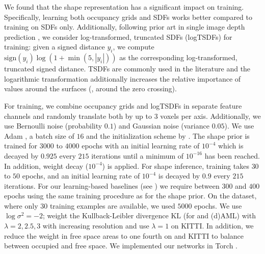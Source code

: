 We found that the shape representation has a significant impact on training. Specifically, learning both occupancy grids and SDFs works better compared to training on SDFs only. Additionally, following prior art in single image depth prediction \citep{Eigen2015ICCV,Eigen2014NIPS,Laina2016THREEDV}, we consider log-transformed, truncated SDFs (logTSDFs) for training: given a signed distance $y_i$, we compute $\text{sign}(y_i)\log(1 + \min(5, |y_i|))$ as the corresponding log-transformed, truncated signed distance. TSDFs are commonly used in the literature \citep{Newcombe2011ISMAR,Riegler2017THREEDV,Dai2017CVPRa,Engelmann2016GCPR,Curless1996SIGGRAPH} and the logarithmic transformation additionally increases the relative importance of values around the surfaces (\ie, around the zero crossing).

For training, we combine occupancy grids and logTSDFs in separate feature channels and randomly translate both by up to $3$ voxels per axis. Additionally, we use Bernoulli noise (probability $0.1$) and Gaussian noise (variance $0.05$). We use Adam \citep{Kingma2015ICLR}, a batch size of $16$ and the initialization scheme by \cite{Glorot2010AISTATS}. The shape prior is trained for $3000$ to $4000$ epochs with an initial learning rate of $10^{-4}$ which is decayed by $0.925$ every $215$ iterations until a minimum of $10^{-16}$ has been reached. In addition, weight decay ($10^{-4}$) is applied. For shape inference, training takes $30$ to $50$ epochs, and an initial learning rate of $10^{-4}$ is decayed by $0.9$ every $215$ iterations. For our learning-based baselines (see ) we require between $300$ and $400$ epochs using the same training procedure as for the shape prior. On the \Kinect dataset, where only $30$ training examples are available, we used $5000$ epochs. We use $\log \sigma^2 = -2$; weight the Kullback-Leibler divergence $\text{KL}$ (for \DVAE and (d)AML) with $\lambda =2, 2.5, 3$ with increasing resolution and use $\lambda = 1$ on KITTI. In addition, we reduce the weight in free space areas to one fourth on \noisy and KITTI to balance between occupied and free space. We implemented our networks in Torch \citep{Collobert2011NIPSWORK}.